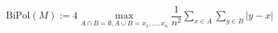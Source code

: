 \documentclass[preview]{standalone}
\begin{document}
\begin{align*}
\text{BiPol}(M) := 4 \max_{A \cap B=\emptyset, A \cup B={x_1,...,x_n}} \dfrac{1}{n^2} \sum_{x \in A} \sum_{y \in B} |y-x|
\end{align*}
\end{document}
